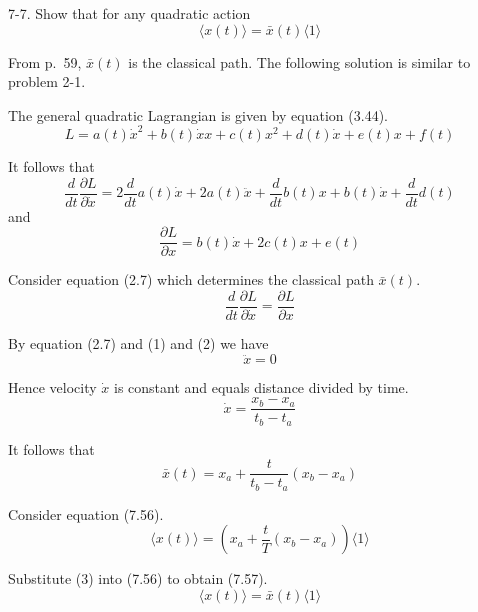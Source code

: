 \documentclass[12pt]{article}
\begin{document}
7-7.
Show that for any quadratic action
\begin{equation*}
\langle x(t)\rangle=\bar x(t)\langle1\rangle
\tag{7.57}
\end{equation*}

From p.~59, $\bar x(t)$ is the classical path.
The following solution is similar to problem 2-1.

\bigskip
The general quadratic Lagrangian is given by equation (3.44).
\begin{equation*}
L=a(t)\dot x^2+b(t)\dot xx+c(t)x^2+d(t)\dot x+e(t)x+f(t)
\tag{3.44}
\end{equation*}

It follows that
\begin{equation*}
\frac{d}{dt}\frac{\partial L}{\partial\dot x}
=2\frac{d}{dt}a(t)\dot x+2a(t)\ddot x
+\frac{d}{dt}b(t)x+b(t)\dot x+\frac{d}{dt}d(t)
\tag{1}
\end{equation*}
and
\begin{equation*}
\frac{\partial L}{\partial x}
=b(t)\dot x+2c(t)x+e(t)
\tag{2}
\end{equation*}

Consider equation (2.7) which determines the classical path $\bar x(t)$.
\begin{equation*}
\frac{d}{dt}\frac{\partial L}{\partial\dot x}=\frac{\partial L}{\partial x}
\tag{2.7}
\end{equation*}

By equation (2.7) and (1) and (2) we have
\begin{equation*}
\ddot x=0
\end{equation*}

Hence velocity $\dot x$ is constant and equals distance divided by time.
\begin{equation*}
\dot x=\frac{x_b-x_a}{t_b-t_a}
\end{equation*}

It follows that
\begin{equation*}
\bar x(t)=x_a+\frac{t}{t_b-t_a}(x_b-x_a)
\tag{3}
\end{equation*}

Consider equation (7.56).
\begin{equation*}
\langle x(t)\rangle=
\left(x_a+\frac{t}{T}(x_b-x_a)\right)\langle1\rangle
\tag{7.56}
\end{equation*}

Substitute (3) into (7.56) to obtain (7.57).
\begin{equation*}
\langle x(t)\rangle=\bar x(t)\langle1\rangle
\tag{7.57}
\end{equation*}
\end{document}
